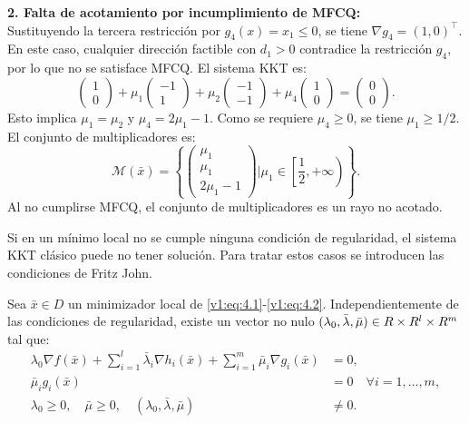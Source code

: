 \begin{example}
 \vspace{0.5em}
 \noindent\textbf{2. Falta de acotamiento por incumplimiento de MFCQ:} \\
 Sustituyendo la tercera restricción por $g_4(x) = x_1 \le 0$, se tiene $\nabla g_4 = (1,0)^\top$. En este caso, cualquier dirección factible con $d_1 > 0$ contradice la restricción $g_4$, por lo que no se satisface MFCQ. El sistema KKT es:
 \[
 \begin{pmatrix} 1 \\ 0 \end{pmatrix} + \mu_1 \begin{pmatrix} -1 \\ 1 \end{pmatrix} + \mu_2 \begin{pmatrix} -1 \\ -1 \end{pmatrix} + \mu_4 \begin{pmatrix} 1 \\ 0 \end{pmatrix} = \begin{pmatrix} 0 \\ 0 \end{pmatrix}.
 \]
 Esto implica $\mu_1 = \mu_2$ y $\mu_4 = 2\mu_1 - 1$. Como se requiere $\mu_4 \ge 0$, se tiene $\mu_1 \ge 1/2$. El conjunto de multiplicadores es:
 \[
 \mathcal{M}(\bar{x}) = \left\{ \begin{pmatrix} \mu_1 \\ \mu_1 \\ 2\mu_1 - 1 \end{pmatrix} \mathrel{\Bigg|} \mu_1 \in \left[\frac{1}{2}, +\infty \right) \right\}.
 \]
 Al no cumplirse MFCQ, el conjunto de multiplicadores es un rayo no acotado.
\end{example}

Si en un mínimo local no se cumple ninguna condición de regularidad, el sistema KKT clásico puede no tener solución. Para tratar estos casos se introducen las condiciones de Fritz John.

\begin{theorem}\label{v1:thm:4.2.3}
 Sea $\bar{x} \in D$ un minimizador local de \eqref{v1:eq:4.1}-\eqref{v1:eq:4.2}. Independientemente de las condiciones de regularidad, existe un vector no nulo $(\lambda_0, \bar{\lambda}, \bar{\mu}) \in R \times R^l \times R^m$ tal que:
 \begin{align}
 \lambda_0 \nabla f(\bar{x}) + \sum_{i=1}^l \bar{\lambda}_i \nabla h_i(\bar{x}) + \sum_{i=1}^m \bar{\mu}_i \nabla g_i(\bar{x}) &= 0, \\
 \bar{\mu}_i g_i(\bar{x}) &= 0 \quad \forall i=1,\dots,m, \nonumber \\
 \lambda_0 \ge 0, \quad \bar{\mu} \ge 0, \quad (\lambda_0, \bar{\lambda}, \bar{\mu}) &\neq 0. \nonumber
 \end{align}
\end{theorem}

